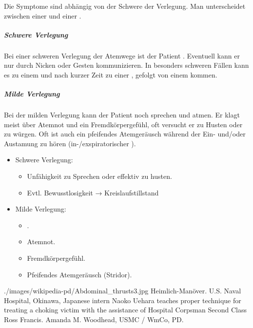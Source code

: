 {%
Die Symptome sind abhängig  von der Schwere der Verlegung. 
Man unterscheidet zwischen einer  und einer  \cite{Erc2005Sec2,Erc2005Sec6,Erc2005DeSec2,Erc2005DeSec6}.

\subparagraph{Schwere Verlegung}
Bei einer schweren Verlegung der Atemwege ist der Patient  . Eventuell kann er nur durch Nicken oder Gesten
kommunizieren. In besonders schweren Fällen kann es zu einem  und
nach kurzer Zeit zu einer , gefolgt von einem
 kommen.


\subparagraph{Milde Verlegung} Bei der milden Verlegung kann der Patient noch
sprechen und atmen. Er klagt meist über Atemnot und ein Fremdkörpergefühl, oft
versucht er zu Husten oder zu würgen. Oft ist auch ein pfeifendes Atemgeräusch
während der Ein- und/oder Austamung zu hören (in-/exspiratorischer ).



}{
\begin{itemize}
  \item Schwere Verlegung:
  \begin{itemize}
    \item Unfähigkeit zu Sprechen oder effektiv zu husten.
    \item Evtl. Bewusstlosigkeit → Kreislaufstillstand
  \end{itemize}
  \item Milde Verlegung:
  \begin{itemize}
    \item {}.
    \item Atemnot. 
    \item Fremdkörpergefühl.
    \item Pfeifendes Atemgeräusch (Stridor).
  \end{itemize}
\end{itemize}
} 
{./images/wikipedia-pd/Abdominal_thrusts3.jpg} 
{Heimlich-Manöver.} 
{U.S. Naval Hospital, Okinawa, Japanese intern Naoko Uehara teaches
proper technique for treating a choking victim with the assistance of Hospital
Corpsman Second Class Ross Francis. Amanda M. Woodhead, USMC / WmCo, PD.}



